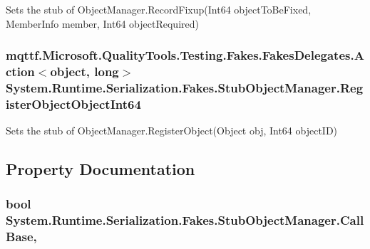 Sets the stub of Object\-Manager.\-Record\-Fixup(\-Int64 object\-To\-Be\-Fixed, Member\-Info member, Int64 object\-Required)

\hypertarget{class_system_1_1_runtime_1_1_serialization_1_1_fakes_1_1_stub_object_manager_a6438e7e8bc254cbc71c59af9dda12a37}{
\subsubsection[{Register\-Object\-Object\-Int64}]{\setlength{\rightskip}{0pt plus 5cm}mqttf.\-Microsoft.\-Quality\-Tools.\-Testing.\-Fakes.\-Fakes\-Delegates.\-Action$<$object, long$>$ System.\-Runtime.\-Serialization.\-Fakes.\-Stub\-Object\-Manager.\-Register\-Object\-Object\-Int64}}\label{class_system_1_1_runtime_1_1_serialization_1_1_fakes_1_1_stub_object_manager_a6438e7e8bc254cbc71c59af9dda12a37}


Sets the stub of Object\-Manager.\-Register\-Object(\-Object obj, Int64 object\-I\-D)



\subsection{Property Documentation}
\hypertarget{class_system_1_1_runtime_1_1_serialization_1_1_fakes_1_1_stub_object_manager_a91ac68203462c085025edc742824011b}{
\subsubsection[{Call\-Base}]{\setlength{\rightskip}{0pt plus 5cm}bool System.\-Runtime.\-Serialization.\-Fakes.\-Stub\-Object\-Manager.\-Call\-Base\hspace{0.3cm}{\ttfamily [get]}, {\ttfamily [set]}}}\label{class_system_1_1_runtime_1_1_serialization_1_1_fakes_1_1_stub_object_manager_a91ac68203462c085025edc742824011b}


